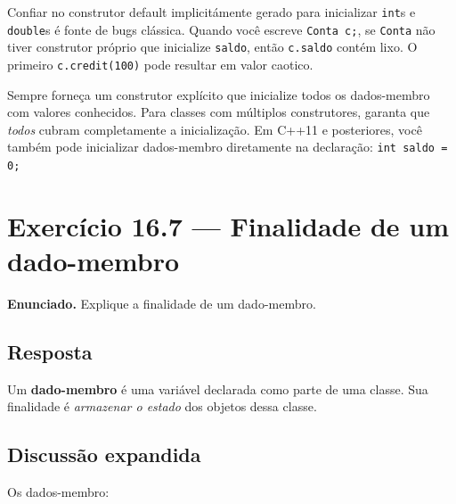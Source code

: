 \documentclass[11pt,a4paper]{article}
\begin{document}
\begin{errocomum}
Confiar no construtor default implicit\'amente gerado para inicializar \texttt{int}s e \texttt{double}s \'e fonte de bugs cl\'assica. Quando voc\^e escreve \texttt{Conta c;}, se \texttt{Conta} n\~ao tiver construtor pr\'oprio que inicialize \texttt{saldo}, ent\~ao \texttt{c.saldo} cont\'em lixo. O primeiro \texttt{c.credit(100)} pode resultar em valor caotico.
\end{errocomum}

\begin{boaprat}
Sempre forne\c{c}a um construtor expl\'icito que inicialize todos os dados-membro com valores conhecidos. Para classes com m\'ultiplos construtores, garanta que \emph{todos} cubram completamente a inicializa\c{c}\~ao. Em C++11 e posteriores, voc\^e tamb\'em pode inicializar dados-membro diretamente na declara\c{c}\~ao: \texttt{int saldo = 0;}
\end{boaprat}

\section{Exerc\'icio 16.7 --- Finalidade de um dado-membro}

\begin{enunciado}
\textbf{Enunciado.} Explique a finalidade de um dado-membro.
\end{enunciado}

\subsection*{Resposta}

Um \textbf{dado-membro} \'e uma vari\'avel declarada como parte de uma classe. Sua finalidade \'e \emph{armazenar o estado} dos objetos dessa classe.

\subsection*{Discuss\~ao expandida}

Os dados-membro:
\end{document}

